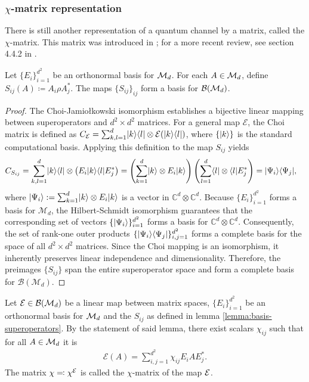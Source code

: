 \subsubsection{$\chi$-matrix representation}
There is still another representation of a quantum channel by a matrix, called the $\chi$-matrix. This matrix was introduced in \cite{Chuang1997}; for a more recent review, see section 4.4.2 in \cite{heinosaariMathematicalLanguageQuantum2011}.
\begin{lemma}\label{lemma:basis-superoperators}
    Let $\{E_i\}_{i=1}^{d^2}$ be an orthonormal basis for $\mathcal M_d$. For each $A \in \mathcal M_d$, define $S_{ij}(A)\coloneqq A_i \rho A_j^*$. The maps $\{S_{ij}\}_{ij}$ form a basis for $\mathcal B(\mathcal M_d)$.
\end{lemma}
\begin{proof}
The Choi-Jamio\l{}kowski isomorphism establishes a bijective linear mapping between superoperators and $d^2 \times d^2$ matrices. For a general map $\mathcal{E}$, the Choi matrix is defined as $C_{\mathcal{E}} = \sum_{k,l=1}^d \lvert k\rangle\langle l\rvert \otimes \mathcal{E}(\lvert k\rangle\langle l\rvert)$, where $\{\lvert k\rangle\}$ is the standard computational basis. Applying this definition to the map $S_{ij}$ yields
\begin{align*}
    C_{S_{ij}} &= \sum_{k,l=1}^d \lvert k\rangle\langle l\rvert \otimes \left(E_i \lvert k\rangle\langle l\rvert E_j^*\right) = \left(\sum_{k=1}^d \lvert k\rangle \otimes E_i \lvert k\rangle\right) \left(\sum_{l=1}^d \langle l\rvert \otimes \langle l\rvert E_j^*\right) = \lvert\Psi_i\rangle\langle\Psi_j\rvert,
\end{align*}
where $\lvert\Psi_i\rangle := \sum_{k=1}^d \lvert k\rangle \otimes E_i \lvert k\rangle$ is a vector in $\mathbb{C}^d \otimes \mathbb{C}^d$. Because $\{E_i\}_{i=1}^{d^2}$ forms a basis for $\mathcal{M}_d$, the Hilbert-Schmidt isomorphism guarantees that the corresponding set of vectors $\{\lvert\Psi_i\rangle\}_{i=1}^{d^2}$ forms a basis for $\mathbb{C}^d \otimes \mathbb{C}^d$. Consequently, the set of rank-one outer products $\{\lvert\Psi_i\rangle\langle\Psi_j\rvert\}_{i,j=1}^{d^2}$ forms a complete basis for the space of all $d^2 \times d^2$ matrices. Since the Choi mapping is an isomorphism, it inherently preserves linear independence and dimensionality. Therefore, the preimages $\{S_{ij}\}$ span the entire superoperator space and form a complete basis for $\mathcal{B}(\mathcal{M}_d)$.
\end{proof}
\begin{definition}
Let $\mathcal{E}\in \mathcal B(\mathcal M_d)$ be a linear map between matrix spaces, $\{E_i\}_{i=1}^{d^2}$ be an orthonormal basis for $\mathcal M_d$ and the $S_{ij}$ as defined in lemma \ref{lemma:basis-superoperators}. By the statement of said lemma, there exist scalars $\chi_{ij}$ such that for all $A \in \mathcal M_d$ it is
\begin{align*}
\mathcal{E}(A) = \sum_{i,j=1}^{d^2} \chi_{ij} E_i A E_j^*.
\end{align*}
The matrix $\chi \eqqcolon \chi^{\mathcal E}$ is called the $\chi$-matrix of the map $\mathcal E$.{}
\end{definition}
